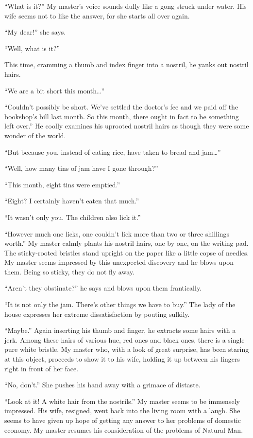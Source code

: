 \documentclass[12pt, openright]{book}
\begin{document}
``What is it?'' My master's voice sounds dully like a gong struck under
water. His wife seems not to like the answer, for she starts all over
again.

``My dear!'' she says.

``Well, what is it?''

This time, cramming a thumb and index finger into a nostril, he yanks
out nostril hairs.

``We are a bit short this month\ldots{}''

``Couldn't possibly be short. We've settled the doctor's fee and we paid
off the bookshop's bill last month. So this month, there ought in fact
to be something left over.'' He coolly examines his uprooted nostril
hairs as though they were some wonder of the world.

``But because you, instead of eating rice, have taken to bread and
jam\ldots{}''

``Well, how many tins of jam have I gone through?''

``This month, eight tins were emptied.''

``Eight? I certainly haven't eaten that much.''

``It wasn't only you. The children also lick it.''

``However much one licks, one couldn't lick more than two or three
shillings worth.'' My master calmly plants his nostril hairs, one by
one, on the writing pad. The sticky-rooted bristles stand upright on the
paper like a little copse of needles. My master seems impressed by this
unexpected discovery and he blows upon them. Being so sticky, they do
not fly away.

``Aren't they obstinate?'' he says and blows upon them frantically.

``It is not only the jam. There's other things we have to buy.'' The
lady of the house expresses her extreme dissatisfaction by pouting
sulkily.

``Maybe.'' Again inserting his thumb and finger, he extracts some hairs
with a jerk. Among these hairs of various hue, red ones and black ones,
there is a single pure white bristle. My master who, with a look of
great surprise, has been staring at this object, proceeds to show it to
his wife, holding it up between his fingers right in front of her face.

``No, don't.'' She pushes his hand away with a grimace of distaste.

``Look at it! A white hair from the nostrils.'' My master seems to be
immensely impressed. His wife, resigned, went back into the living room
with a laugh. She seems to have given up hope of getting any answer to
her problems of domestic economy. My master resumes his consideration of
the problems of Natural Man.
\end{document}
